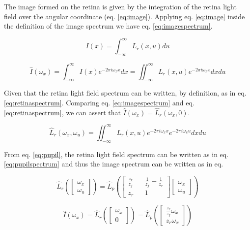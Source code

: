 \documentclass[acmtog,review,anonymous]{acmart}
\begin{document}
The image formed on the retina is given by the integration of the retina light field over the angular coordinate (eq. \ref{eq:image}). Applying eq. \ref{eq:image} inside the definition of the image spectrum we have eq. \ref{eq:imagespectrum}.

\begin{equation} \label{eq:image}
I(x) = \int_{-\infty}^{\infty} L_{r}\left(x, u\right) du
\end{equation}

\begin{equation} \label{eq:imagespectrum}
\hat{I}(\omega_{x}) = \int_{-\infty}^{\infty} I(x) e^{-2 \pi i \omega_{x} x} dx =
\iint_{-\infty}^{\infty} L_{r}\left(x, u\right) e^{-2 \pi i \omega_{x} x} dx du
\end{equation}

Given that the retina light field spectrum can be written, by definition, as in eq. \ref{eq:retinaspectrum}. Comparing eq. \ref{eq:imagespectrum} and eq. \ref{eq:retinaspectrum}, we can assert that $\hat{I}(\omega_{x}) = \hat{L}_{r}(\omega_{x}, 0)$.

\begin{equation} \label{eq:retinaspectrum}
\hat{L}_{r}(\omega_{x}, \omega_{u}) =
\iint_{-\infty}^{\infty} L_{r}\left(x, u\right) e^{-2 \pi i \omega_{x} x} e^{-2 \pi i \omega_{u} u} dx du
\end{equation}

From eq. \ref{eq:pupil}, the retina light field spectrum can be written as in eq. \ref{eq:pupilspectrum} and thus the image spectrum can be written as in eq.

\begin{equation} \label{eq:pupilspectrum}
\hat{L}_{r}\left(\begin{bmatrix}\omega_{x}\\\omega_{u}\end{bmatrix}\right) =
\hat{L}_{p}\left(\begin{bmatrix}\frac{z_{r}}{z_{f}} && \frac{1}{z_{f}} - \frac{1}{z_{r}}\\z_{r} && 1\end{bmatrix} \begin{bmatrix}\omega_{x}\\\omega_{u}\end{bmatrix}\right)
\end{equation}

\begin{equation} \label{eq:spectrum}
\hat{I}(\omega_{x}) = \hat{L}_{r}\left(\begin{bmatrix}\omega_{x}\\0\end{bmatrix}\right) =
\hat{L}_{p}\left(\begin{bmatrix}\frac{z_{r}}{z_{f}}\omega_{x}\\z_{r}\omega_{x}\end{bmatrix}\right)
\end{equation}
\end{document}
